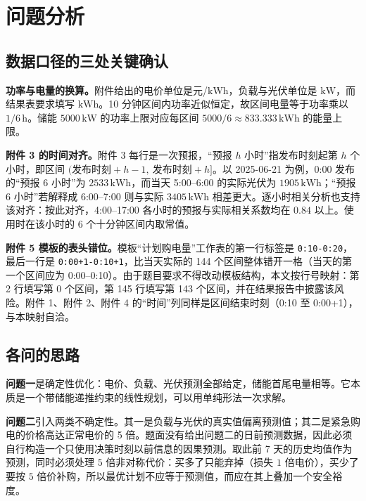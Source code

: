 \section{问题分析}

\subsection{数据口径的三处关键确认}

\textbf{功率与电量的换算。}附件给出的电价单位是元/$\mathrm{kWh}$，负载与光伏单位是 $\mathrm{kW}$，而结果表要求填写 $\mathrm{kWh}$。10 分钟区间内功率近似恒定，故区间电量等于功率乘以 $1/6\,\mathrm{h}$。储能 $5000\,\mathrm{kW}$ 的功率上限对应每区间 $5000/6\approx833.333\,\mathrm{kWh}$ 的能量上限。

\textbf{附件 3 的时间对齐。}附件 3 每行是一次预报，“预报 $h$ 小时”指发布时刻起第 $h$ 个小时，即区间 $(\text{发布时刻}+h-1,\ \text{发布时刻}+h]$。以 2025-06-21 为例，0:00 发布的“预报 6 小时”为 $2533\,\mathrm{kWh}$，而当天 5:00--6:00 的实际光伏为 $1905\,\mathrm{kWh}$；“预报 6 小时”若解释成 6:00--7:00 则与实际 $3405\,\mathrm{kWh}$ 相差更大。逐小时相关分析也支持该对齐：按此对齐，4:00--17:00 各小时的预报与实际相关系数均在 $0.84$ 以上。使用时在该小时的 6 个十分钟区间内取常值。

\textbf{附件 5 模板的表头错位。}模板“计划购电量”工作表的第一行标签是 \texttt{0:10-0:20}，最后一行是 \texttt{0:00+1-0:10+1}，比当天实际的 144 个区间整体错开一格（当天的第一个区间应为 0:00--0:10）。由于题目要求不得改动模板结构，本文按行号映射：第 2 行填写第 0 个区间，第 145 行填写第 143 个区间，并在结果报告中披露该风险。附件 1、附件 2、附件 4 的“时间”列同样是区间结束时刻（0:10 至 0:00+1），与本映射自洽。

\subsection{各问的思路}

\textbf{问题一}是确定性优化：电价、负载、光伏预测全部给定，储能首尾电量相等。它本质是一个带储能递推约束的线性规划\cite{boyd2004}，可以用单纯形法一次求解。

\textbf{问题二}引入两类不确定性。其一是负载与光伏的真实值偏离预测值；其二是紧急购电的价格高达正常电价的 5 倍。题面没有给出问题二的日前预测数据，因此必须自行构造一个只使用决策时刻以前信息的因果预测\cite{hyndman2021}。取此前 7 天的历史均值作为预测，同时必须处理 $5$ 倍非对称代价：买多了只能弃掉（损失 $1$ 倍电价），买少了要按 $5$ 倍价补购，所以最优计划不应等于预测值，而应在其上叠加一个安全裕度。

